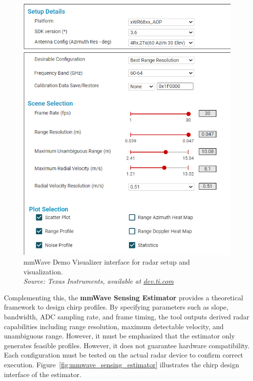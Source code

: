 \begin{figure}[!htbp]
    \centering
    \includegraphics[width=0.9\linewidth]{images/mmWaveDemoVisualizer.png}
    \caption{mmWave Demo Visualizer interface for radar setup and visualization.\\
    \textit{Source: Texas Instruments, available at \href{https://dev.ti.com/gallery/view/mmwave/mmWave_Demo_Visualizer/ver/3.6.0/}{dev.ti.com}}}
    \label{fig:mmwave_demo_visualizer}
\end{figure}

Complementing this, the \textbf{mmWave Sensing Estimator} \cite{mmwave_demo_output} provides a theoretical framework to design chirp profiles.  
By specifying parameters such as slope, bandwidth, ADC sampling rate, and frame timing, the tool outputs derived radar capabilities including range resolution, maximum detectable velocity, and unambiguous range.  
However, it must be emphasized that the estimator only generates feasible profiles. However, it does not guarantee hardware compatibility.  
Each configuration must be tested on the actual radar device to confirm correct execution.  
Figure~\ref{fig:mmwave_sensing_estimator} illustrates the chirp design interface of the estimator.  

